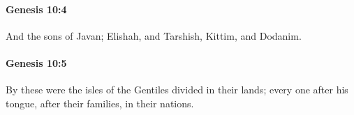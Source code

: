 		\paragraph{Genesis 10:4} %
			\label{GENESIS-10-4}

			And the sons of Javan; Elishah, and Tarshish, Kittim, and Dodanim.


		\paragraph{Genesis 10:5} %
			\label{GENESIS-10-5}

			By these were the isles of the Gentiles divided in their lands; every one after his tongue, after their families, in their nations.


